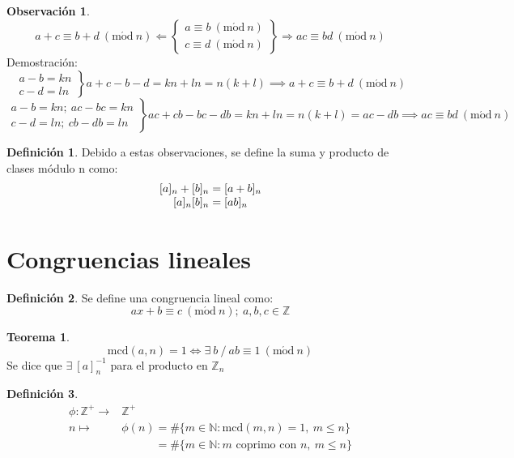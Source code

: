 \documentclass[10pt,a4paper]{article}
\theoremstyle{definition}
\newtheorem{definition}{Definición}[section]
\newtheorem{theorem}{Teorema}[section]
\newtheorem{obs}{Observación}[section]
\newcommand{\Mod}[1]{\ (\mathrm{m\acute od}\ #1)}
\begin{document}
\begin{obs}
	\[a+c\equiv b+d\Mod{n}
	\Longleftarrow\left\{\begin{array}{c}
		a\equiv b\Mod{n}\\ 
		c\equiv d\Mod{n}
	\end{array}\right\}\Longrightarrow
	ac\equiv bd\Mod{n}\]
Demostración:
\[\left.\begin{array}{c}
	a-b = kn\\
	c-d = ln
\end{array}\right\}a+c-b-d = kn+ln = n(k+l)\implies a+c\equiv b+d\Mod{n}
\]
\[\left.\begin{array}{c}
	a-b = kn;\:ac-bc = kn\\
	c-d = ln;\:cb-db = ln
\end{array}\right\}ac+cb-bc-db = kn+ln= n(k+l) = ac-db \implies ac\equiv bd \Mod{n} \]
\end{obs}
\begin{definition}
	Debido a estas observaciones, se define la suma y producto de clases módulo n como:
\[
\begin{array}{c}
	[a]_n+[b]_n = [a+b]_n\\\relax
	[a]_n [b]_n = [ab]_n
\end{array}
\]
\end{definition}

\section{Congruencias lineales}
\begin{definition} Se define una congruencia lineal como:
	\[ax+b\equiv c \Mod{n};\: a,b,c\in\mathbb{Z}\]
\end{definition}

\begin{theorem}
	\[\text{mcd}(a,n) = 1 \iff \exists\: b\:/\:ab\equiv 1\Mod{n}\]
	Se dice que $\exists\:[a]_n^{-1}$ para el producto en $\mathbb{Z}_n$
\end{theorem}

\begin{definition}
	\[\begin{array}{rl}
		\phi:\mathbb{Z}^+\longrightarrow & \mathbb{Z}^+\\
		n\longmapsto & \phi(n) = \#\{m\in\mathbb{N}:\text{mcd}(m,n)=1,\: m\leq n\}\\&
		\phantom{\phi(n)}= \#\{m\in\mathbb{N}:m\text{ coprimo con }n,\:m\leq n\}
	\end{array}\]
\end{definition}
\end{document}

